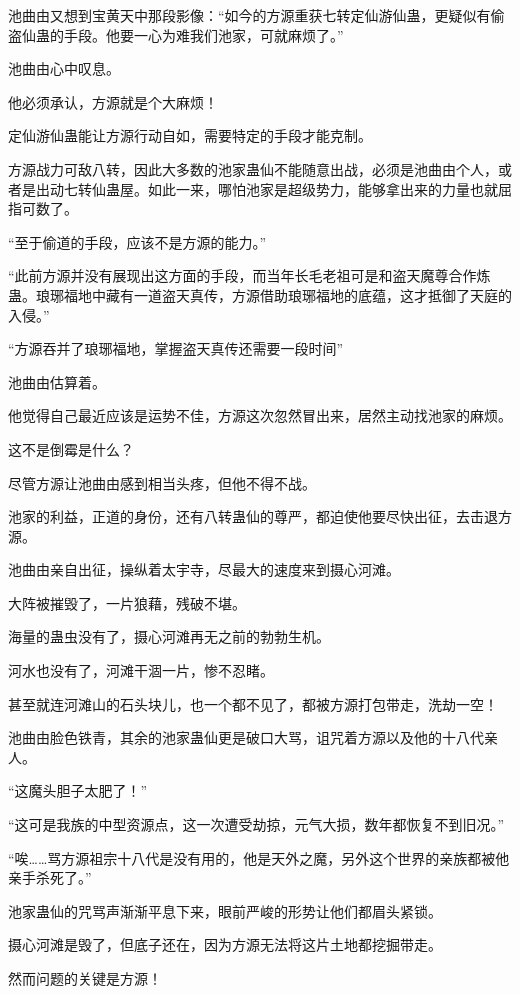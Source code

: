 \begin{this_body}
池曲由又想到宝黄天中那段影像：“如今的方源重获七转定仙游仙蛊，更疑似有偷盗仙蛊的手段。他要一心为难我们池家，可就麻烦了。”

池曲由心中叹息。

他必须承认，方源就是个大麻烦！

定仙游仙蛊能让方源行动自如，需要特定的手段才能克制。

方源战力可敌八转，因此大多数的池家蛊仙不能随意出战，必须是池曲由个人，或者是出动七转仙蛊屋。如此一来，哪怕池家是超级势力，能够拿出来的力量也就屈指可数了。

“至于偷道的手段，应该不是方源的能力。”

“此前方源并没有展现出这方面的手段，而当年长毛老祖可是和盗天魔尊合作炼蛊。琅琊福地中藏有一道盗天真传，方源借助琅琊福地的底蕴，这才抵御了天庭的入侵。”

“方源吞并了琅琊福地，掌握盗天真传还需要一段时间”

池曲由估算着。

他觉得自己最近应该是运势不佳，方源这次忽然冒出来，居然主动找池家的麻烦。

这不是倒霉是什么？

尽管方源让池曲由感到相当头疼，但他不得不战。

池家的利益，正道的身份，还有八转蛊仙的尊严，都迫使他要尽快出征，去击退方源。

池曲由亲自出征，操纵着太宇寺，尽最大的速度来到摄心河滩。

大阵被摧毁了，一片狼藉，残破不堪。

海量的蛊虫没有了，摄心河滩再无之前的勃勃生机。

河水也没有了，河滩干涸一片，惨不忍睹。

甚至就连河滩山的石头块儿，也一个都不见了，都被方源打包带走，洗劫一空！

池曲由脸色铁青，其余的池家蛊仙更是破口大骂，诅咒着方源以及他的十八代亲人。

“这魔头胆子太肥了！”

“这可是我族的中型资源点，这一次遭受劫掠，元气大损，数年都恢复不到旧况。”

“唉……骂方源祖宗十八代是没有用的，他是天外之魔，另外这个世界的亲族都被他亲手杀死了。”

池家蛊仙的咒骂声渐渐平息下来，眼前严峻的形势让他们都眉头紧锁。

摄心河滩是毁了，但底子还在，因为方源无法将这片土地都挖掘带走。

然而问题的关键是方源！


\end{this_body}

